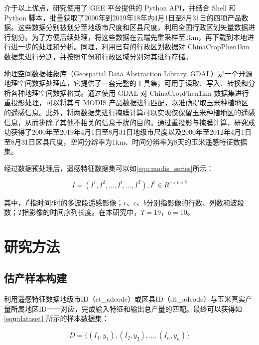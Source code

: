 \par 介于以上优点，研究使用了 GEE 平台提供的 Python API，并结合 Shell 和 Python 脚本，批量获取了2000年到2019年18年内4月1日至8月31日的四项产品数据。这些数据分别被划分至地级市尺度和区县尺度，利用全国行政区划矢量数据进行划分。为了方便后续处理，将这些数据在云端先重采样至1km，再下载到本地进行进一步的处理和分析。同理，利用已有的行政区划数据对 ChinaCropPhen1km 数据集进行分割，并按照年份和行政区域分别对其进行存储。

\par 地理空间数据抽象库\cite{warmerdam2008geospatial}（Geospatial Data Abstraction Library, GDAL）是一个开源地理空间数据处理库，它提供了一套完整的工具集，可用于读取、写入、转换和分析各种地理空间数据格式。通过使用 GDAL 对 ChinaCropPhen1km 数据集进行重投影处理，可以将其与 MODIS 产品数据进行匹配，以准确提取玉米种植地区的遥感信息。此外，将两数据集进行掩膜计算可以实现仅保留玉米种植地区的遥感信息，从而排除了其他不相关的信息干扰的目的。通过重投影与掩膜计算，研究成功获得了2000年至2019年4月1日至8月31日地级市尺度以及2000年至2012年4月1日至8月31日区县尺度，空间分辨率为1km、时间分辨率为8天的玉米遥感特征数据集。

\par 经过数据预处理后，遥感特征数据集可以如\autoref{equ:modis_series}所示：

\begin{equation}
    \label{equ:modis_series}
    I=(I^1, I^2, ..., I^t, ..., I^T), I^t\in R^{r\times c\times b}
\end{equation}
\par 其中，$I^t$指时间$t$时的多波段遥感影像；$r$、$c$、$b$分别指影像的行数、列数和波段数；$T$指影像的时间序列长度。在本研究中，$T=19$，$b=10$。

\section{研究方法}
\subsection{估产样本构建}

\par 利用遥感特征数据地级市ID（ct\_adcode）或区县ID（dt\_adcode）与玉米真实产量所属地区ID一一对应，完成输入特征和输出总产量的匹配。最终可以获得如\autoref{equ:dataset1}所示的样本数据集：

\begin{equation}
  \label{equ:dataset1}
  D=\{(I_1, y_1),(I_2, y_2), ..., (I_n, y_n)\}
\end{equation}

